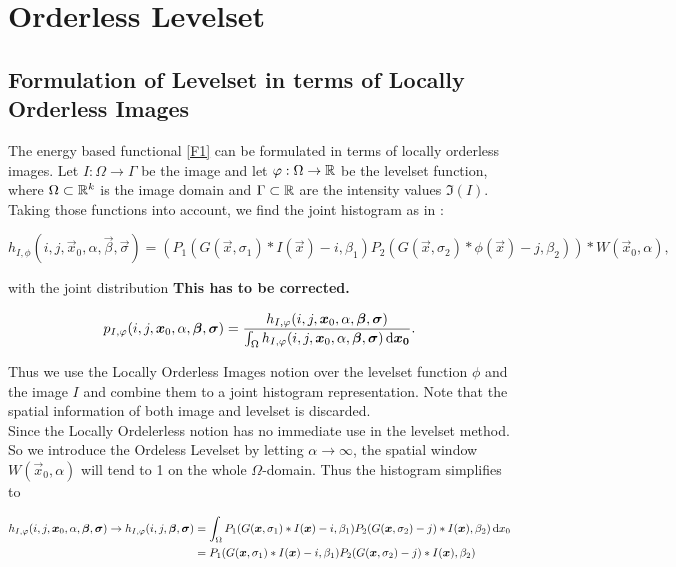 
\chapter{Orderless Levelset}\label{chapter:OL}
\section{Formulation of Levelset in terms of Locally Orderless Images}\label{section:OLform}
The energy based functional \eqref{F1} can be formulated in terms of locally orderless images. Let $I:\Omega\to \Gamma$ be the image and let $\varphi:\Omega\to\mathbb R$ be the levelset function, where $\Omega\subset \mathbb R^k$ is the image domain and $\Gamma\subset\mathbb R$ are the intensity values $\Im(I)$. Taking those functions into account, we find the joint histogram as in \cite{dar.11}:

\begin{equation}
  h_{I,\phi}(i,j,\vec{x}_0,\alpha,\vec{\beta},\vec{\sigma}) = (P_1(G(\vec{x},\sigma_1)*I(\vec{x})-i,\beta_1)P_2(G(\vec{x},\sigma_2)*\phi(\vec{x})-j,\beta_2))*W(\vec{x}_0,\alpha),
\end{equation}

with the joint distribution \textbf{This has to be corrected.}

\begin{equation}
  p_{I,\varphi}(i,j,\boldsymbol{x} _0,\alpha,\boldsymbol{\beta} ,\boldsymbol{\sigma} ) = \frac{h_{I,\varphi}(i,j,\boldsymbol{x} _0,\alpha,\boldsymbol{\beta} ,\boldsymbol{\sigma} )}{\int_\Omega h_{I,\varphi}(i,j,\boldsymbol{x} _0,\alpha,\boldsymbol{\beta} ,\boldsymbol{\sigma} )\,{\rm d} \boldsymbol{x_0} }.
\end{equation}

Thus we use the Locally Orderless Images notion over the levelset function $\phi$ and the image $I$ and combine them to a joint histogram representation. Note that the spatial information of both image and levelset is discarded.\\
Since the Locally Ordelerless notion has no immediate use in the levelset method. So we introduce the Ordeless Levelset by letting $\alpha\to \infty$, the spatial window $W(\vec{x}_0,\alpha)$ will tend to 1 on the whole $\Omega$-domain. Thus the histogram simplifies to

\begin{equation}
  \begin{split}
    h_{I,\varphi}(i,j,\boldsymbol{x} _0,\alpha,\boldsymbol{\beta} ,\boldsymbol{\sigma} )\to h_{I,\varphi}(i,j,\boldsymbol{\beta} ,\boldsymbol{\sigma} ) &= \int _\Omega P_1(G(\boldsymbol{x} ,\sigma_1)*I(\boldsymbol{x} )-i,\beta_1)P_2(G(\boldsymbol{x} ,\sigma_2)-j)*I(\boldsymbol{x} ),\beta_2)\,{\rm d} x_0\\
    &= P_1(G(\boldsymbol{x} ,\sigma_1)*I(\boldsymbol{x} )-i,\beta_1)P_2(G(\boldsymbol{x} ,\sigma_2)-j)*I(\boldsymbol{x} ),\beta_2)
  \end{split}
\end{equation}

